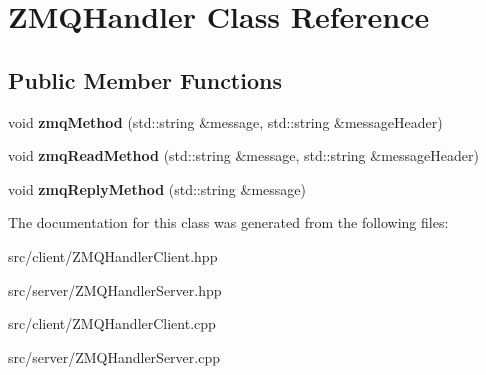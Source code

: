 \hypertarget{class_z_m_q_handler}{}\section{Z\+M\+Q\+Handler Class Reference}
\label{class_z_m_q_handler}
\subsection*{Public Member Functions}
\begin{DoxyCompactItemize}
\item 
void {\bfseries zmq\+Method} (std\+::string \&message, std\+::string \&message\+Header)\hypertarget{class_z_m_q_handler_a2b25bb9a6b699f34b46e8ac9a720920f}{}\label{class_z_m_q_handler_a2b25bb9a6b699f34b46e8ac9a720920f}

\item 
void {\bfseries zmq\+Read\+Method} (std\+::string \&message, std\+::string \&message\+Header)\hypertarget{class_z_m_q_handler_ac490adce32e43430d97df9d182a9fafa}{}\label{class_z_m_q_handler_ac490adce32e43430d97df9d182a9fafa}

\item 
void {\bfseries zmq\+Reply\+Method} (std\+::string \&message)\hypertarget{class_z_m_q_handler_a3f80778a54859fdb870e053e8ed459f3}{}\label{class_z_m_q_handler_a3f80778a54859fdb870e053e8ed459f3}

\end{DoxyCompactItemize}


The documentation for this class was generated from the following files\+:\begin{DoxyCompactItemize}
\item 
src/client/Z\+M\+Q\+Handler\+Client.\+hpp\item 
src/server/Z\+M\+Q\+Handler\+Server.\+hpp\item 
src/client/Z\+M\+Q\+Handler\+Client.\+cpp\item 
src/server/Z\+M\+Q\+Handler\+Server.\+cpp\end{DoxyCompactItemize}
